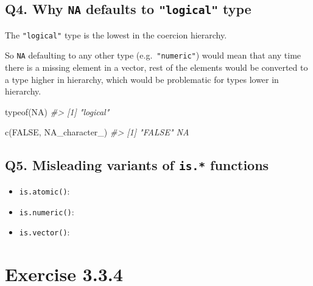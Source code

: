 \documentclass[
]{book}
\newenvironment{Shaded}{\begin{snugshade}}{\end{snugshade}}
\newcommand{\CommentTok}[1]{\textcolor[rgb]{0.56,0.35,0.01}{\textit{#1}}}
\newcommand{\ConstantTok}[1]{\textcolor[rgb]{0.00,0.00,0.00}{#1}}
\newcommand{\FunctionTok}[1]{\textcolor[rgb]{0.00,0.00,0.00}{#1}}
\newcommand{\NormalTok}[1]{#1}
\providecommand{\tightlist}{%
  \setlength{\itemsep}{0pt}\setlength{\parskip}{0pt}}
\begin{document}
\hypertarget{q4.-why-na-defaults-to-logical-type}{%
\subsection*{\texorpdfstring{Q4. Why \texttt{NA} defaults to \texttt{"logical"} type}{Q4. Why NA defaults to "logical" type}}\label{q4.-why-na-defaults-to-logical-type}}

The \texttt{"logical"} type is the lowest in the coercion hierarchy.

So \texttt{NA} defaulting to any other type (e.g.~\texttt{"numeric"}) would mean that any time there is a missing element in a vector, rest of the elements would be converted to a type higher in hierarchy, which would be problematic for types lower in hierarchy.

\begin{Shaded}
\begin{Highlighting}[]
\FunctionTok{typeof}\NormalTok{(}\ConstantTok{NA}\NormalTok{)}
\CommentTok{\#\textgreater{} [1] "logical"}

\FunctionTok{c}\NormalTok{(}\ConstantTok{FALSE}\NormalTok{, }\ConstantTok{NA\_character\_}\NormalTok{)}
\CommentTok{\#\textgreater{} [1] "FALSE" NA}
\end{Highlighting}
\end{Shaded}

\hypertarget{q5.-misleading-variants-of-is.-functions}{%
\subsection*{\texorpdfstring{Q5. Misleading variants of \texttt{is.*} functions}{Q5. Misleading variants of is.* functions}}\label{q5.-misleading-variants-of-is.-functions}}

\begin{itemize}
\tightlist
\item
  \texttt{is.atomic()}:
\item
  \texttt{is.numeric()}:
\item
  \texttt{is.vector()}:
\end{itemize}

\hypertarget{exercise-3.3.4}{%
\section{Exercise 3.3.4}\label{exercise-3.3.4}}
\end{document}
